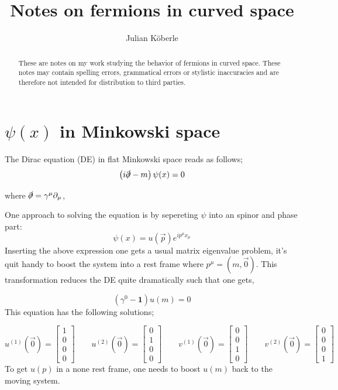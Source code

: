 \documentclass[12pt,a4paper]{article}
\author{Julian Köberle}
\title{Notes on fermions in curved space}
\begin{document}
	\maketitle
	
	\newcommand{\np}{\slashed{\partial}}
	\newcommand{\nG}{\slashed{\Gamma}}
	\newcommand{\nn}{\slashed{\nabla}}
	\newcommand{\overbar}[1]{\mkern 1.5mu\overline{\mkern-1.5mu#1\mkern-1.5mu}\mkern 1.5mu}\textbf{}
	
	
	\newcommand{\tensor}[3]{{#1}^{#2}_{#3}}
	
	
	\begin{abstract}
		These are notes on my work studying the behavior of fermions in curved space. These notes may contain spelling errors, grammatical errors or stylistic inaccuracies and are therefore not intended for distribution to third parties.
		
	\end{abstract}
	
	\tableofcontents 
	
	
	\section{$\psi(x)$ in Minkowski space}
	The Dirac equation (DE) in flat Minkowski space reads as follows;
	\begin{equation}
		\label{diracEq}
		\left( i \np -m \right) \psi(x) = 0 
	\end{equation}

	where $\np = \gamma^\mu \partial_\mu$,
	
	One approach to solving the equation is by sepereting $\psi$ into an spinor and phase part:
	$$
	\psi(x) = u(\vec{p}) e^{i p^\mu x_\mu}
	$$
	Inserting the above expression one gets a usual matrix eigenvalue problem, it's quit handy to boost the system into a rest frame where $p^\mu = (m, \vec{0})$. This transformation reduces the DE quite dramatically such that one gets,
	
	$$
	(\gamma^0 - \mathbf{1} )u(m) = 0
	$$
	This equation has the following solutions;
	
	$$
	u^{(1)}\left({\vec {0}}\right)={\begin{bmatrix}1\\0\\0\\0\end{bmatrix}}\qquad u^{(2)}\left({\vec {0}}\right)={\begin{bmatrix}0\\1\\0\\0\end{bmatrix}}\qquad v^{(1)}\left({\vec {0}}\right)={\begin{bmatrix}0\\0\\1\\0\end{bmatrix}}\qquad v^{(2)}\left({\vec {0}}\right)={\begin{bmatrix}0\\0\\0\\1\end{bmatrix}}
	$$
	To get $u(p)$ in a none rest frame, one needs to boost $u(m)$ back to the moving system. 
	
\end{document}
